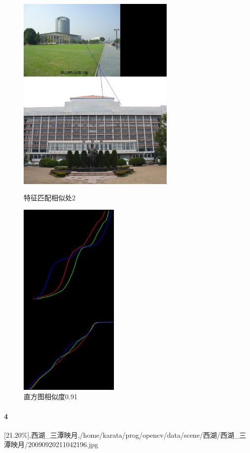 \begin{figure}[htb]
\begin{minipage}[t]{0.5\linewidth}
\centering
\includegraphics[height=3.8in]{紫金港图书馆.jpg.d/im3sift.jpg}
\caption{特征匹配相似处2}
\label{fig:side:a}
\end{minipage}%
\begin{minipage}[t]{0.5\linewidth}
\centering
\includegraphics[height=3.8in]{紫金港图书馆.jpg.d/im3hist2.jpg}
\caption{直方图相似度0.91}
\label{fig:side:a}
\end{minipage}%
\end{figure}

\clearpage
\paragraph{4}
[21.20\%],西湖\_三潭映月,/home/karata/prog/opencv/data/scene/西湖/西湖\_三潭映月/20090920211042196.jpg

